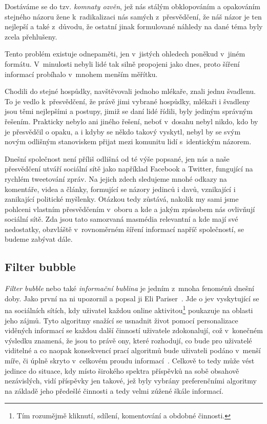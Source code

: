 \documentclass[12pt, a4paper]{article}
\numberwithin{equation}{section} 	%
\begin{document}
Dostáváme se do tzv. \textit{komnaty ozvěn}, jež nás stálým obklopováním a opakováním stejného názoru žene k radikalizaci nás samých z přesvědčení, že náš názor je ten nejlepší a také z důvodu, že ostatní jinak formulované náhledy na dané téma byly zcela přehlušeny.

Tento problém existuje odnepaměti, jen v jistých ohledech poněkud v jiném formátu. V minulosti nebyli lidé tak silně propojeni jako dnes, proto šíření informací probíhalo v mnohem menším měřítku.

Chodili do stejné hospůdky, navštěvovali jednoho mlékaře, znali jednu švadlenu. To je vedlo k přesvědčení, že právě jimi vybrané hospůdky, mlékaři i švadleny jsou těmi nejlepšími a postupy, jimiž se daní lidé řídili, byly jediným správným řešením. Prakticky nebylo ani jiného řešení, neboť v dosahu nebyl nikdo, kdo by je přesvědčil o opaku, a i kdyby se někdo takový vyskytl, nebyl by se svým novým odlišným stanoviskem přijat mezi komunitu lidí s identickým názorem.

Dnešní společnost není příliš odlišná od té výše popsané, jen nás a naše přesvědčení utváří sociální sítě jako například Facebook a Twitter, fungující na rychlém tweetování zpráv.  Na jejich zdech sledujeme mnohé odkazy na komentáře, videa a články, formující se názory jedinců i davů, vznikající i zanikající politické myšlenky. Otázkou tedy zůstává, nakolik my sami jsme pohlceni vlastním přesvědčením v oboru a kde a jakým způsobem nás ovlivňují sociální sítě.  Zda jsou tato samozvaná masmédia relevantní a kde mají své nedostatky, obzvláště v rovnoměrném šíření informací napříč společností, se budeme zabývat dále.


\subsection{Filter bubble}
\noindent \textit{Filter bubble} nebo také \textit{informační bublina} je jedním z mnoha fenoménů dnešní doby. Jako první na ni upozornil a popsal ji Eli Pariser~\cite{Pariser2011, PariserTed}. Jde o jev vyskytující se na sociálních sítích, kdy uživatel každou online aktivitou\footnote{Tím rozumějmě kliknutí, sdílení, komentování a obdobné činnosti.} poukazuje na oblasti jeho zájmů. Tyto algoritmy snažící se usnadnit život pomocí personalizace viděných informací se každou další činností uživatele zdokonalují, což v konečném výsledku znamená, že jsou to právě ony, které rozhodují, co bude pro uživatelé viditelné a co naopak konsekvencí prací algoritmů bude uživateli podáno v menší míře, či úplně skryto v celkovém proudu informací~\cite{TheImpactOfFilterBubble}. Celkově to tedy může vést jedince do situace, kdy místo širokého spektra příspěvků na sobě obsahově nezávislých, vidí příspěvky jen takové, jež byly vybrány preferenčními algoritmy na základě jeho předešlé činnosti a tedy velmi zúžené škále informací.
\end{document}
